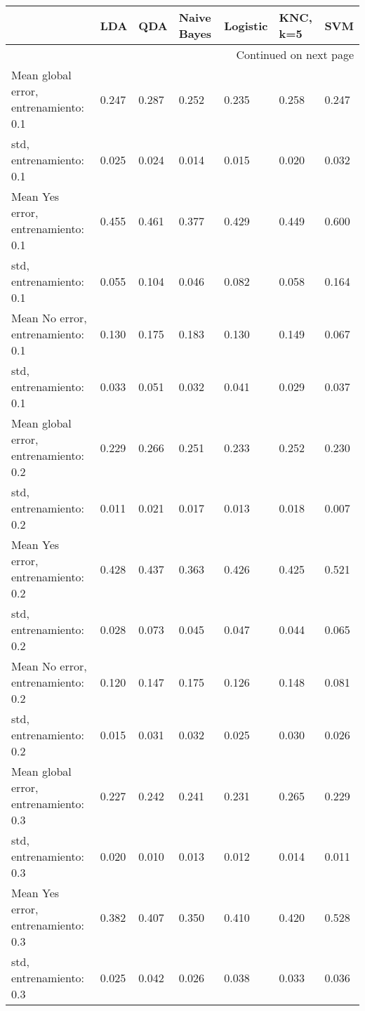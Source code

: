 \begin{longtable}{p{4cm}|p{1.5cm}|p{1.5cm}|p{1.5cm}|p{1.5cm}|p{1.5cm}|p{1.5cm}}
\toprule
{} &   LDA &   QDA &  Naive Bayes &  Logistic &  KNC, k=5 &   SVM \\
\midrule
\endhead
\midrule
\multicolumn{7}{r}{{Continued on next page}} \\
\midrule
\endfoot

\bottomrule
\endlastfoot
Mean global error, entrenamiento: 0.1 & 0.247 & 0.287 &        0.252 &     0.235 &     0.258 & 0.247 \\
std, entrenamiento: 0.1               & 0.025 & 0.024 &        0.014 &     0.015 &     0.020 & 0.032 \\
Mean Yes error, entrenamiento: 0.1    & 0.455 & 0.461 &        0.377 &     0.429 &     0.449 & 0.600 \\
std, entrenamiento: 0.1               & 0.055 & 0.104 &        0.046 &     0.082 &     0.058 & 0.164 \\
Mean No error, entrenamiento: 0.1     & 0.130 & 0.175 &        0.183 &     0.130 &     0.149 & 0.067 \\
std, entrenamiento: 0.1               & 0.033 & 0.051 &        0.032 &     0.041 &     0.029 & 0.037 \\
Mean global error, entrenamiento: 0.2 & 0.229 & 0.266 &        0.251 &     0.233 &     0.252 & 0.230 \\
std, entrenamiento: 0.2               & 0.011 & 0.021 &        0.017 &     0.013 &     0.018 & 0.007 \\
Mean Yes error, entrenamiento: 0.2    & 0.428 & 0.437 &        0.363 &     0.426 &     0.425 & 0.521 \\
std, entrenamiento: 0.2               & 0.028 & 0.073 &        0.045 &     0.047 &     0.044 & 0.065 \\
Mean No error, entrenamiento: 0.2     & 0.120 & 0.147 &        0.175 &     0.126 &     0.148 & 0.081 \\
std, entrenamiento: 0.2               & 0.015 & 0.031 &        0.032 &     0.025 &     0.030 & 0.026 \\
Mean global error, entrenamiento: 0.3 & 0.227 & 0.242 &        0.241 &     0.231 &     0.265 & 0.229 \\
std, entrenamiento: 0.3               & 0.020 & 0.010 &        0.013 &     0.012 &     0.014 & 0.011 \\
Mean Yes error, entrenamiento: 0.3    & 0.382 & 0.407 &        0.350 &     0.410 &     0.420 & 0.528 \\
std, entrenamiento: 0.3               & 0.025 & 0.042 &        0.026 &     0.038 &     0.033 & 0.036 \\

\end{longtable}
